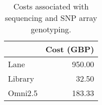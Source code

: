 \begin{table}[htp]
\centering
\begin{tabular}{l|r}
 & Cost (\gls{GBP}) \\ \hline
Lane & 950.00 \\
Library & 32.50 \\
Omni2.5 & 183.33 \\
\end{tabular}
\caption{Costs associated with sequencing and \gls{SNP} array genotyping.}
\label{tab:costs}
\end{table}